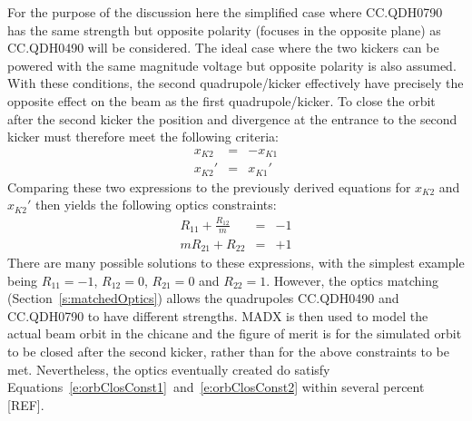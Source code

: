 For the purpose of the discussion here the simplified case where CC.QDH0790 has the same strength but opposite polarity (focuses in the opposite plane) as CC.QDH0490 will be considered. The ideal case where the two kickers can be powered with the same magnitude voltage but opposite polarity is also assumed. With these conditions, the second quadrupole/kicker effectively have precisely the opposite effect on the beam as the first quadrupole/kicker. To close the orbit after the second kicker the position and divergence at the entrance to the second kicker must therefore meet the following criteria:
\begin{eqnarray}
x_{K2} &=& -x_{K1} \\
x_{K2}' &=& x_{K1}'
\end{eqnarray}
Comparing these two expressions to the previously derived equations for \(x_{K2}\) and \(x_{K2}'\) then yields the following optics constraints:
\begin{eqnarray}
R_{11} + \frac{R_{12}}{m} &=& -1  \label{e:orbClosConst1} \\
m R_{21} + R_{22} &=& +1 \label{e:orbClosConst2}
\end{eqnarray}
There are many possible solutions to these expressions, with the simplest example being \(R_{11} = -1\), \(R_{12} = 0\), \(R_{21} = 0\) and \(R_{22} = 1\). However, the optics matching (Section~\ref{s:matchedOptics}) allows the quadrupoles CC.QDH0490 and CC.QDH0790 to have different strengths. MADX is then used to model the actual beam orbit in the chicane and the figure of merit is for the simulated orbit to be closed after the second kicker, rather than for the above constraints to be met. Nevertheless, the optics eventually created do satisfy Equations~\ref{e:orbClosConst1}~and~\ref{e:orbClosConst2} within several percent [REF].


